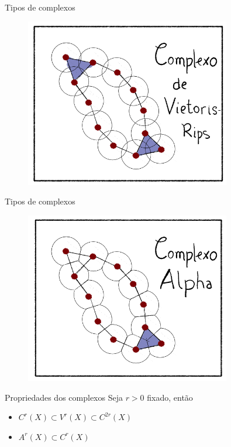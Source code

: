 \documentclass[10pt]{beamer}
\begin{document}
\begin{frame}{Tipos de complexos}
    \begin{figure}
        \centering
        \includegraphics[width=0.8\textwidth]{../images/ComplexRips.png}
    \end{figure}   
\end{frame}

\begin{frame}{Tipos de complexos}
    \begin{figure}
        \centering
        \includegraphics[width=0.8\textwidth]{../images/ComplexAlpha.png}
    \end{figure}   
\end{frame}

\begin{frame}{Propriedades dos complexos}
    Seja $r > 0$ fixado, então
    \begin{itemize}
        \item $C^r(X) \subset V^r(X) \subset C^{2r}(X)$
        \item $A^r(X) \subset C^r(X)$
    \end{itemize} 
\end{frame}
\end{document}
